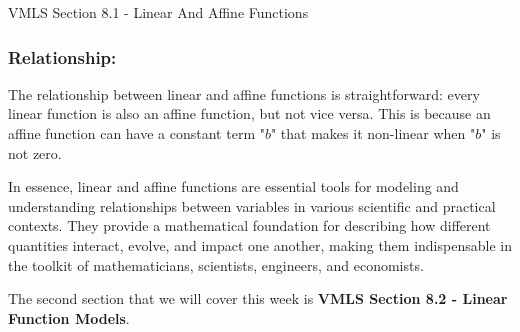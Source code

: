 \begin{notes}{VMLS Section 8.1 - Linear And Affine Functions}
    \subsubsection*{Relationship:}

    The relationship between linear and affine functions is straightforward: every linear function is also an affine function, but not vice versa. This is because an affine function can have a constant 
    term "$b$" that makes it non-linear when "$b$" is not zero.
    
    In essence, linear and affine functions are essential tools for modeling and understanding relationships between variables in various scientific and practical contexts. They provide a mathematical 
    foundation for describing how different quantities interact, evolve, and impact one another, making them indispensable in the toolkit of mathematicians, scientists, engineers, and economists.
\end{notes}

The second section that we will cover this week is \textbf{VMLS Section 8.2 - Linear Function Models}.

